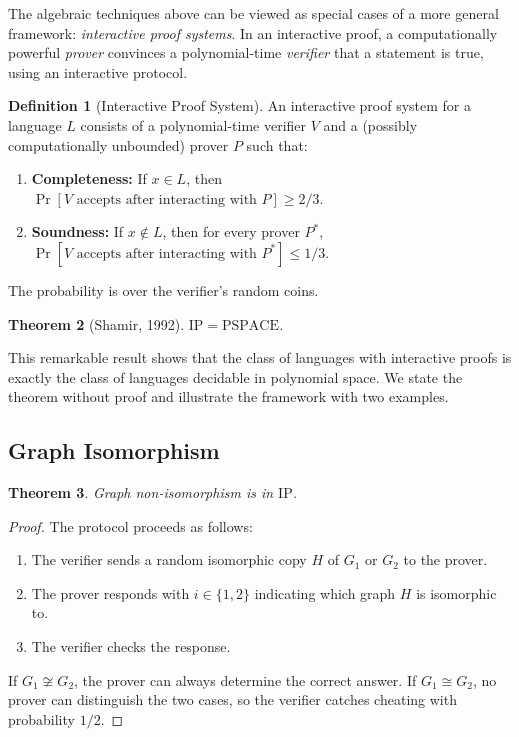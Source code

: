 \documentclass[twoside,12pt]{book}
\theoremstyle{plain}
\newtheorem{theorem}{Theorem}[chapter]
\theoremstyle{definition}
\newtheorem{definition}[theorem]{Definition}
\theoremstyle{remark}
\begin{document}
The algebraic techniques above can be viewed as special cases of a more general framework: \emph{interactive proof systems}. In an interactive proof, a computationally powerful \emph{prover} convinces a polynomial-time \emph{verifier} that a statement is true, using an interactive protocol.

\begin{definition}[Interactive Proof System]
An interactive proof system for a language $L$ consists of a polynomial-time verifier $V$ and a (possibly computationally unbounded) prover $P$ such that:
\begin{enumerate}[label=(\roman*)]
\item \textbf{Completeness:} If $x \in L$, then $\Pr[V \text{ accepts after interacting with } P] \geq 2/3$.
\item \textbf{Soundness:} If $x \notin L$, then for every prover $P^*$, $\Pr[V \text{ accepts after interacting with } P^*] \leq 1/3$.
\end{enumerate}
The probability is over the verifier's random coins.
\end{definition}

\begin{theorem}[Shamir, 1992]
$\mathrm{IP} = \mathrm{PSPACE}$.
\end{theorem}

This remarkable result shows that the class of languages with interactive proofs is exactly the class of languages decidable in polynomial space. We state the theorem without proof and illustrate the framework with two examples.

\subsection*{Graph Isomorphism}

\begin{theorem}
Graph non-isomorphism is in $\mathrm{IP}$.
\end{theorem}

\begin{proof}
The protocol proceeds as follows:
\begin{enumerate}
\item The verifier sends a random isomorphic copy $H$ of $G_1$ or $G_2$ to the prover.
\item The prover responds with $i \in \{1, 2\}$ indicating which graph $H$ is isomorphic to.
\item The verifier checks the response.
\end{enumerate}
If $G_1 \not\cong G_2$, the prover can always determine the correct answer. If $G_1 \cong G_2$, no prover can distinguish the two cases, so the verifier catches cheating with probability $1/2$.
\end{proof}
\end{document}
